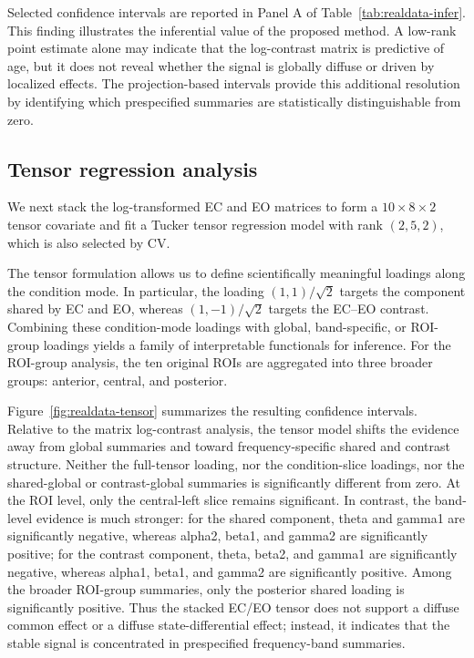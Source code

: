 \documentclass[authoryear,preprint,review,12pt]{elsarticle}
\begin{document}
Selected confidence intervals are reported in Panel A of Table~\ref{tab:realdata-infer}. This finding illustrates the inferential value of the proposed method. A low-rank point estimate alone may indicate that the log-contrast matrix is predictive of age, but it does not reveal whether the signal is globally diffuse or driven by localized effects. The projection-based intervals provide this additional resolution by identifying which prespecified summaries are statistically distinguishable from zero.

\subsection{Tensor regression analysis}
We next stack the log-transformed EC and EO matrices to form a $10\times 8\times 2$ tensor covariate and fit a Tucker tensor regression model with rank $(2,5,2)$,  which is also selected by CV.

The tensor formulation allows us to define scientifically meaningful loadings along the condition mode. In particular, the loading $(1,1)/\sqrt{2}$ targets the component shared by EC and EO, whereas $(1,-1)/\sqrt{2}$ targets the EC--EO contrast. Combining these condition-mode loadings with global, band-specific, or ROI-group loadings yields a family of interpretable functionals for inference. For the ROI-group analysis, the ten original ROIs are aggregated into three broader groups: anterior, central, and posterior.

Figure~\ref{fig:realdata-tensor} summarizes the resulting confidence intervals. Relative to the matrix log-contrast analysis, the tensor model shifts the evidence away from global summaries and toward frequency-specific shared and contrast structure. Neither the full-tensor loading, nor the condition-slice loadings, nor the shared-global or contrast-global summaries is significantly different from zero. At the ROI level, only the central-left slice remains significant. In contrast, the band-level evidence is much stronger: for the shared component, theta and gamma1 are significantly negative, whereas alpha2, beta1, and gamma2 are significantly positive; for the contrast component, theta, beta2, and gamma1 are significantly negative, whereas alpha1, beta1, and gamma2 are significantly positive. Among the broader ROI-group summaries, only the posterior shared loading is significantly positive. Thus the stacked EC/EO tensor does not support a diffuse common effect or a diffuse state-differential effect; instead, it indicates that the stable signal is concentrated in prespecified frequency-band summaries.
\end{document}
